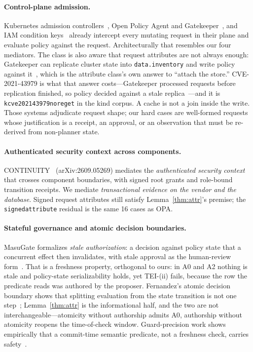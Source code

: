\documentclass[acmsmall,manuscript,review,anonymous]{acmart}
\renewcommand{\_}{\discretionary{\textunderscore}{}{\textunderscore}}
\begin{document}
\paragraph{Control-plane admission.}
Kubernetes admission controllers~\cite{k8s-admission}, Open Policy Agent and
Gatekeeper~\cite{opa,gatekeeper}, and IAM condition keys~\cite{aws-iam-conditions}
already intercept every mutating request in their plane and evaluate policy
against the request. Architecturally that resembles our four mediators. The class is
also aware that request attributes are not always enough: Gatekeeper can
replicate cluster state into \texttt{data.inventory} and write policy against
it~\cite{gatekeeper-replication}, which is the attribute class's own answer to
``attach the store.'' CVE-2021-43979 is what that answer costs---Gatekeeper
processed requests before replication finished, so policy decided against a
stale replica~\cite{cve202143979}---and it is
\texttt{k\_cve\_2021\_43979\_no\_reget} in the kind corpus. A cache is not a
join inside the write. Those systems adjudicate request shape; our hard
cases are well-formed requests whose justification is a receipt, an
approval, or an observation that must be re-derived from non-planner
state.

\paragraph{Authenticated security context across components.}
CONTINUITY~\cite{continuity2026} (arXiv:2609.05269) mediates the
\emph{authenticated security context} that crosses component boundaries,
with signed root grants and role-bound transition receipts. We mediate
\emph{transactional evidence on the vendor and the database}. Signed
request attributes still satisfy Lemma~\ref{thm:attr}'s premise; the
\texttt{signed\_attribute} residual is the same 16 cases as OPA.

\paragraph{Stateful governance and atomic decision boundaries.}
MasuGate formalizes \emph{stale authorization}: a decision against policy
state that a concurrent effect then invalidates, with stale approval as the
human-review form~\cite{peng2026masugate}. That is a freshness property,
orthogonal to ours: in {A0} and {A2} nothing is stale and policy-state
serializability holds, yet {TEI}-(ii) fails, because the row the predicate
reads was authored by the proposer. Fernandez's atomic decision boundary
shows that splitting evaluation from the state transition is not one
step~\cite{fernandez2026atomic}; Lemma~\ref{thm:attr} is the informational
half, and the two are not interchangeable---atomicity without authorship
admits {A0}, authorship without atomicity reopens the time-of-check window.
Guard-precision work shows empirically that a commit-time semantic
predicate, not a freshness check, carries safety~\cite{zheng2026stale}.
\end{document}
